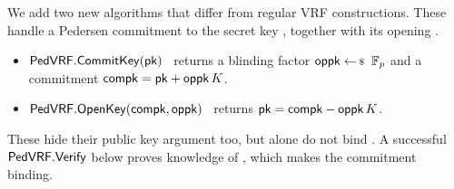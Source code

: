 \noindent We add two new algorithms that differ from regular VRF constructions.
These handle a Pedersen commitment to the secret key \sk,
 together with its opening \openpk.
\begin{itemize}
\item ${\mathsf{PedVRF}}.{\mathsf{CommitKey}}(\mathsf{pk})$ \,
returns a blinding factor $\openpk \leftsample \F_p$
and a commitment $\mathsf{compk} = \mathsf{pk} + \mathsf{oppk} \, K$.
\item ${\mathsf{PedVRF}}.{\mathsf{OpenKey}}(\mathsf{compk},\mathsf{oppk})$ \,
returns $\mathsf{pk} = \mathsf{compk} - \mathsf{oppk} \, K$.
\end{itemize}
These hide their public key argument \pk too, but alone do not bind \pk.
A successful ${\mathsf{PedVRF}}.{\mathsf{Verify}}$ below proves knowledge of \compk,
 which makes the commitment binding.

